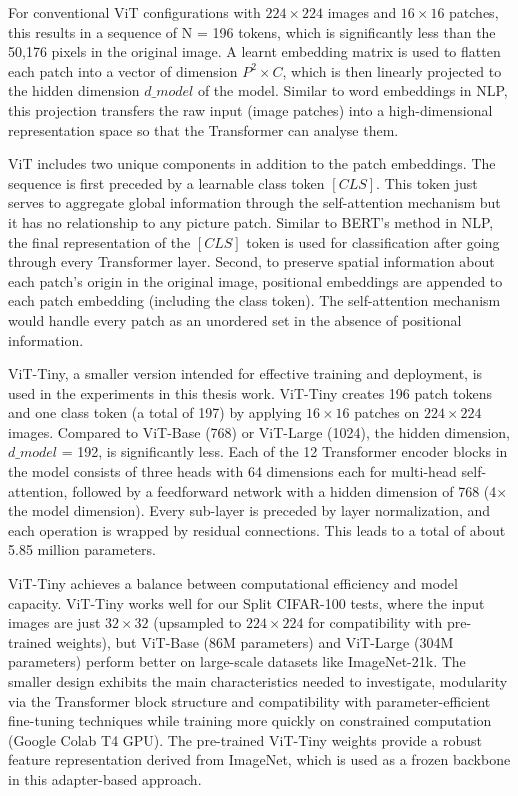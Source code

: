 \documentclass[english, LaM, oneside]{sapthesis}%
\numberwithin{equation}{chapter}
\begin{document}
For conventional ViT configurations with $224\times224$ images and $16\times16$ patches, this results in a sequence of N = 196 tokens, which is significantly less than the 50,176 pixels in the original image. A learnt embedding matrix is used to flatten each patch into a vector of dimension $P^2 \times C$, which is then linearly projected to the hidden dimension $d\_model$ of the model. Similar to word embeddings in NLP, this projection transfers the raw input (image patches) into a high-dimensional representation space so that the Transformer can analyse them.

ViT includes two unique components in addition to the patch embeddings. The sequence is first preceded by a learnable class token $[CLS]$\cite{28}. This token just serves to aggregate global information through the self-attention mechanism but it has no relationship to any picture patch. Similar to BERT's method in NLP, the final representation of the $[CLS]$ token is used for classification after going through every Transformer layer. Second, to preserve spatial information about each patch's origin in the original image, positional embeddings are appended to each patch embedding (including the class token). The self-attention mechanism would handle every patch as an unordered set in the absence of positional information.

ViT-Tiny, a smaller version intended for effective training and deployment, is used in the experiments in this thesis work. ViT-Tiny creates 196 patch tokens and one class token (a total of 197) by applying $16\times16$ patches on $224\times224$ images\cite{29}. Compared to ViT-Base (768) or ViT-Large (1024), the hidden dimension, $d\_model$ = 192, is significantly less. Each of the 12 Transformer encoder blocks in the model consists of three heads with 64 dimensions each for multi-head self-attention, followed by a feedforward network with a hidden dimension of 768 (4× the model dimension). Every sub-layer is preceded by layer normalization, and each operation is wrapped by residual connections. This leads to a total of about 5.85 million parameters\cite{29}.

ViT-Tiny achieves a balance between computational efficiency and model capacity. ViT-Tiny works well for our Split CIFAR-100 tests, where the input images are just $32\times32$ (upsampled to $224\times224$ for compatibility with pre-trained weights), but ViT-Base (86M parameters) and ViT-Large (304M parameters) perform better on large-scale datasets like ImageNet-21k\cite{4}. The smaller design exhibits the main characteristics needed to investigate, modularity via the Transformer block structure and compatibility with parameter-efficient fine-tuning techniques while training more quickly on constrained computation (Google Colab T4 GPU). The pre-trained ViT-Tiny weights provide a robust feature representation derived from ImageNet, which is used as a frozen backbone in this adapter-based approach.
\end{document}
